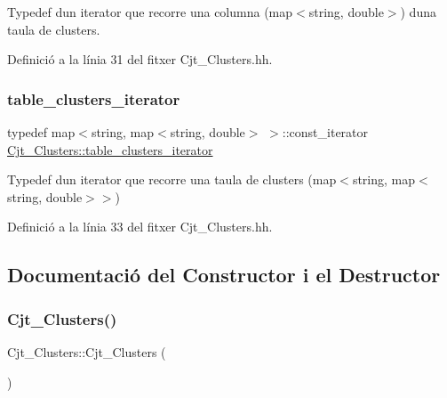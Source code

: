 Typedef d\textquotesingle{}un iterator que recorre una columna (map$<$string, double$>$) d\textquotesingle{}una taula de clusters. 



Definició a la línia 31 del fitxer Cjt\+\_\+\+Clusters.\+hh.

\mbox{\label{class_cjt___clusters_ac53ace59de6ecf75f90d7a4fc6e56c0e}} 
\subsubsection{\texorpdfstring{table\+\_\+clusters\+\_\+iterator}{table\_clusters\_iterator}}
{\footnotesize\ttfamily typedef map$<$string, map$<$string, double$>$ $>$\+::const\+\_\+iterator \hyperlink{class_cjt___clusters_ac53ace59de6ecf75f90d7a4fc6e56c0e}{Cjt\+\_\+\+Clusters\+::table\+\_\+clusters\+\_\+iterator}\hspace{0.3cm}{\ttfamily [private]}}



Typedef d\textquotesingle{}un iterator que recorre una taula de clusters (map$<$string, map$<$string, double$>$$>$) 



Definició a la línia 33 del fitxer Cjt\+\_\+\+Clusters.\+hh.



\subsection{Documentació del Constructor i el Destructor}
\mbox{\label{class_cjt___clusters_a2e55759944a78043744103e19dd87c1c}} 
\subsubsection{\texorpdfstring{Cjt\+\_\+\+Clusters()}{Cjt\_Clusters()}}
{\footnotesize\ttfamily Cjt\+\_\+\+Clusters\+::\+Cjt\+\_\+\+Clusters (\begin{DoxyParamCaption}{ }\end{DoxyParamCaption})}



